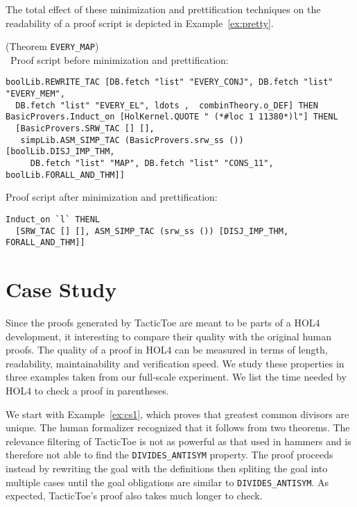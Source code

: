 \documentclass[runningheads,a4paper,draft]{svjour3}
\def\holfour{\textsf{HOL4}\xspace}
\def\tactictoe{\textsf{TacticToe}\xspace}
\begin{document}
The total effect of these minimization and prettification techniques
on the readability of a proof script is depicted in
Example~\ref{ex:pretty}.

\begin{example}(Theorem \texttt{EVERY\_MAP})\label{ex:pretty}\\\
Proof script before minimization and prettification:
\begin{lstlisting}[language=SMLSmall]
boolLib.REWRITE_TAC [DB.fetch "list" "EVERY_CONJ", DB.fetch "list" "EVERY_MEM",
  DB.fetch "list" "EVERY_EL", ldots ,  combinTheory.o_DEF] THEN
BasicProvers.Induct_on [HolKernel.QUOTE " (*#loc 1 11380*)l"] THENL
  [BasicProvers.SRW_TAC [] [],
   simpLib.ASM_SIMP_TAC (BasicProvers.srw_ss ()) [boolLib.DISJ_IMP_THM,
     DB.fetch "list" "MAP", DB.fetch "list" "CONS_11", boolLib.FORALL_AND_THM]]

\end{lstlisting}
Proof script after minimization and prettification:
\begin{lstlisting}[language=SMLSmall]
Induct_on `l` THENL
  [SRW_TAC [] [], ASM_SIMP_TAC (srw_ss ()) [DISJ_IMP_THM, FORALL_AND_THM]]
\end{lstlisting}
\end{example}

\section{Case Study}
Since the proofs generated by \tactictoe are meant to be parts of a \holfour development, it interesting to compare their quality with the original human proofs.
The quality of a proof in \holfour can be measured in terms of length, readability, maintainability and verification speed.
We study these properties in three examples taken from our full-scale experiment.
We list the time needed by \holfour to check a proof in parentheses.

We start with Example~\ref{ex:cs1}, which proves that greatest common divisors are unique.
The human formalizer recognized that it follows from two theorems.
The relevance filtering of \tactictoe is not as powerful as that used in hammers
and is therefore not able to find the \texttt{DIVIDES\_ANTISYM} property. The proof
proceeds instead by rewriting the
goal with the definitions then spliting the goal into multiple cases until the goal obligations are similar
to \texttt{DIVIDES\_ANTISYM}. As expected, \tactictoe's proof
also takes much longer to check.
\end{document}
